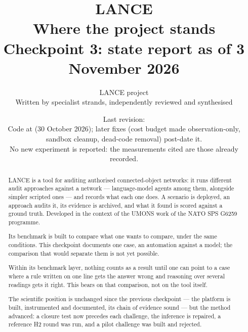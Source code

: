 \documentclass[11pt,a4paper]{article}
\title{LANCE\\[4pt]
\large Where the project stands\\[2pt]
\normalsize Checkpoint 3: state report as of 3 November 2026}
\author{LANCE project\\\small Written by specialist strands, independently reviewed and synthesised}
\date{Last revision: \revision\\[3pt]
\small Code at \code{546b911} (30 October 2026); later fixes (cost budget made
observation-only, sandbox cleanup, dead-code removal) post-date it.\\
No new experiment is reported: the measurements cited are those already recorded.}
\begin{document}
\maketitle

\begin{abstract}
LANCE is a tool for auditing authorised connected-object networks: it runs
different audit approaches against a network --- language-model agents among them,
alongside simpler scripted ones --- and records what each one does. A scenario is
deployed, an approach audits it, its evidence is archived, and what it found is
scored against a ground truth. Developed in the context of the UMONS work of the
NATO SPS G6259 programme.

Its benchmark is built to compare what one wants to compare, under the same
conditions. This checkpoint documents one case, an automation against a model; the
comparison that would separate them is not yet possible.

Within its benchmark layer, nothing counts as a result until one can point to a
case where a rule written on one line gets the answer wrong and reasoning over
several readings gets it right. This bears on that comparison, not on the tool
itself.

The scientific position is unchanged since the previous checkpoint --- the platform
is built, instrumented and documented, its chain of evidence sound --- but the
method advanced: a closure test now precedes each challenge, the inference is
repaired, a reference H2 round was run, and a pilot challenge was built and rejected.
\end{abstract}

\tableofcontents
\clearpage






\end{document}
